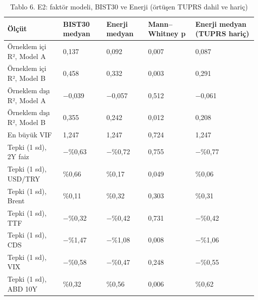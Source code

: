 \begin{table}
\caption{Tablo 6. E2: faktör modeli, BIST30 ve Enerji (örtüşen TUPRS dahil ve hariç)}
\label{tab:tablo_06_e2_faktor_modeli}
\begin{tabular}{lllll}
\toprule
Ölçüt & BIST30 medyan & Enerji medyan & Mann–Whitney p & Enerji medyan (TUPRS hariç) \\
\midrule
Örneklem içi R², Model A & 0,137 & 0,092 & 0,007 & 0,087 \\
Örneklem içi R², Model B & 0,458 & 0,332 & 0,003 & 0,291 \\
Örneklem dışı R², Model A & −0,039 & −0,057 & 0,512 & −0,061 \\
Örneklem dışı R², Model B & 0,355 & 0,242 & 0,012 & 0,208 \\
En büyük VIF & 1,247 & 1,247 & 0,724 & 1,247 \\
Tepki (1 sd), 2Y faiz & −\%0,63 & −\%0,72 & 0,755 & −\%0,77 \\
Tepki (1 sd), USD/TRY & \%0,66 & \%0,17 & 0,049 & \%0,06 \\
Tepki (1 sd), Brent & \%0,11 & \%0,32 & 0,303 & \%0,31 \\
Tepki (1 sd), TTF & −\%0,32 & −\%0,42 & 0,731 & −\%0,42 \\
Tepki (1 sd), CDS & −\%1,47 & −\%1,08 & 0,008 & −\%1,06 \\
Tepki (1 sd), VIX & −\%0,58 & −\%0,47 & 0,248 & −\%0,55 \\
Tepki (1 sd), ABD 10Y & \%0,32 & \%0,56 & 0,006 & \%0,62 \\
\bottomrule
\end{tabular}
\end{table}
